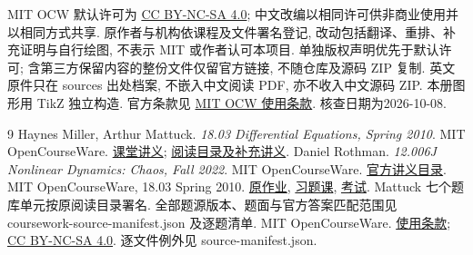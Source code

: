 MIT OCW 默认许可为 \href{https://creativecommons.org/licenses/by-nc-sa/4.0/}{CC BY-NC-SA 4.0}; 中文改编以相同许可供非商业使用并以相同方式共享. 原作者与机构依课程及文件署名登记, 改动包括翻译、重排、补充证明与自行绘图, 不表示 MIT 或作者认可本项目. 单独版权声明优先于默认许可; 含第三方保留内容的整份文件仅留官方链接, 不随仓库及源码 ZIP 复制. 英文原件只在 sources 出处档案, 不嵌入中文阅读 PDF, 亦不收入中文源码 ZIP. 本册图形用 TikZ 独立构造. 官方条款见 \href{https://ocw.mit.edu/pages/privacy-and-terms-of-use/}{MIT OCW 使用条款}. 核查日期为2026-10-08.

\clearpage
\originalcontents
\clearpage
\mainmatter




















\begin{thebibliography}{9}
 Haynes Miller, Arthur Mattuck. \textit{18.03 Differential Equations, Spring 2010}. MIT OpenCourseWare. \href{https://ocw.mit.edu/courses/18-03-differential-equations-spring-2010/pages/lecture-notes/}{课堂讲义}; \href{https://ocw.mit.edu/courses/18-03-differential-equations-spring-2010/pages/readings/}{阅读目录及补充讲义}.
 Daniel Rothman. \textit{12.006J Nonlinear Dynamics: Chaos, Fall 2022}. MIT OpenCourseWare. \href{https://ocw.mit.edu/courses/12-006j-nonlinear-dynamics-chaos-fall-2022/pages/lecture-notes/}{官方讲义目录}.
 MIT OpenCourseWare, 18.03 Spring 2010. \href{https://ocw.mit.edu/courses/18-03-differential-equations-spring-2010/pages/assignments/}{原作业}, \href{https://ocw.mit.edu/courses/18-03-differential-equations-spring-2010/pages/recitations/}{习题课}, \href{https://ocw.mit.edu/courses/18-03-differential-equations-spring-2010/pages/exams/}{考试}. Mattuck 七个题库单元按原阅读目录署名. 全部题源版本、题面与官方答案匹配范围见 coursework-source-manifest.json 及逐题清单.
 MIT OpenCourseWare. \href{https://ocw.mit.edu/pages/privacy-and-terms-of-use/}{使用条款}; \href{https://creativecommons.org/licenses/by-nc-sa/4.0/}{CC BY-NC-SA 4.0}. 逐文件例外见 source-manifest.json.
\end{thebibliography}

